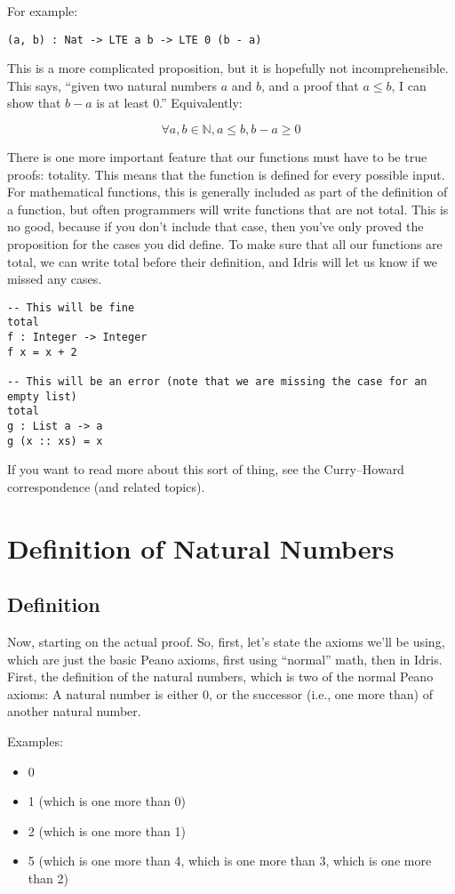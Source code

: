 \documentclass{article}
\begin{document}
For example:

\begin{verbatim}
(a, b) : Nat -> LTE a b -> LTE 0 (b - a)
\end{verbatim}

This is a more complicated proposition, but it is hopefully not incomprehensible.
This says, “given two natural numbers $a$ and $b$, and a proof that $a \leq b$, I can show that $b - a$ is at least $0$.”
Equivalently:

\[
    \forall a, b \in \mathbb{N}, a \leq b, b - a \geq 0
\]

There is one more important feature that our functions must have to be true proofs: totality.
This means that the function is defined for every possible input.
For mathematical functions, this is generally included as part of the definition of a function, but often programmers will write functions that are not total.
This is no good, because if you don't include that case, then you've only proved the proposition for the cases you did define.
To make sure that all our functions are total, we can write total before their definition, and Idris will let us know if we missed any cases.

\begin{verbatim}
-- This will be fine
total
f : Integer -> Integer
f x = x + 2

-- This will be an error (note that we are missing the case for an empty list)
total
g : List a -> a
g (x :: xs) = x
\end{verbatim}

If you want to read more about this sort of thing, see the Curry--Howard correspondence (and related topics).

\section{Definition of Natural Numbers}
\subsection{Definition}
Now, starting on the actual proof.
So, first, let's state the axioms we'll be using, which are just the basic Peano axioms, first using ``normal'' math, then in Idris.
First, the definition of the natural numbers, which is two of the normal Peano axioms:
A natural number is either 0, or the successor (i.e., one more than) of another natural number.

Examples:
\begin{itemize}
    \item 0
    \item 1 (which is one more than 0)
    \item 2 (which is one more than 1)
    \item 5 (which is one more than 4, which is one more than 3, which is one more than 2)
\end{itemize}
\end{document}
